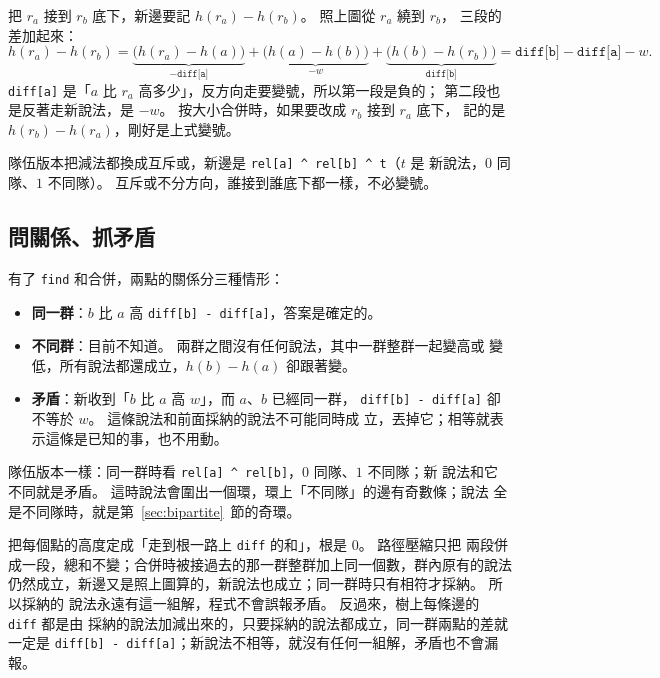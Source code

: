 把 $r_a$ 接到 $r_b$ 底下，新邊要記 $h(r_a) - h(r_b)$。 照上圖從 $r_a$ 繞到 $r_b$，
三段的差加起來：
\[
h(r_a) - h(r_b)
= \underbrace{\bigl(h(r_a) - h(a)\bigr)}_{-\texttt{diff[a]}}
+ \underbrace{\bigl(h(a) - h(b)\bigr)}_{-w}
+ \underbrace{\bigl(h(b) - h(r_b)\bigr)}_{\texttt{diff[b]}}
= \texttt{diff[b]} - \texttt{diff[a]} - w .
\]
\texttt{diff[a]} 是「$a$ 比 $r_a$ 高多少」，反方向走要變號，所以第一段是負的；
第二段也是反著走新說法，是 $-w$。 按大小合併時，如果要改成 $r_b$ 接到 $r_a$ 底下，
記的是 $h(r_b) - h(r_a)$，剛好是上式變號。

隊伍版本把減法都換成互斥或，新邊是 \texttt{rel[a] \^{} rel[b] \^{} t}（$t$ 是
新說法，$0$ 同隊、$1$ 不同隊）。 互斥或不分方向，誰接到誰底下都一樣，不必變號。

\subsection{問關係、抓矛盾}

有了 \texttt{find} 和合併，兩點的關係分三種情形：

\begin{itemize}
\item \textbf{同一群}：$b$ 比 $a$ 高 \texttt{diff[b] - diff[a]}，答案是確定的。
\item \textbf{不同群}：目前不知道。 兩群之間沒有任何說法，其中一群整群一起變高或
變低，所有說法都還成立，$h(b) - h(a)$ 卻跟著變。
\item \textbf{矛盾}：新收到「$b$ 比 $a$ 高 $w$」，而 $a$、$b$ 已經同一群，
\texttt{diff[b] - diff[a]} 卻不等於 $w$。 這條說法和前面採納的說法不可能同時成
立，丟掉它；相等就表示這條是已知的事，也不用動。
\end{itemize}

隊伍版本一樣：同一群時看 \texttt{rel[a] \^{} rel[b]}，$0$ 同隊、$1$ 不同隊；新
說法和它不同就是矛盾。 這時說法會圍出一個環，環上「不同隊」的邊有奇數條；說法
全是不同隊時，就是第~\ref{sec:bipartite}~節的奇環。

\begin{whybox}
把每個點的高度定成「走到根一路上 \texttt{diff} 的和」，根是 $0$。 路徑壓縮只把
兩段併成一段，總和不變；合併時被接過去的那一群整群加上同一個數，群內原有的說法
仍然成立，新邊又是照上圖算的，新說法也成立；同一群時只有相符才採納。 所以採納的
說法永遠有這一組解，程式不會誤報矛盾。 反過來，樹上每條邊的 \texttt{diff} 都是由
採納的說法加減出來的，只要採納的說法都成立，同一群兩點的差就一定是
\texttt{diff[b] - diff[a]}；新說法不相等，就沒有任何一組解，矛盾也不會漏報。
\end{whybox}


